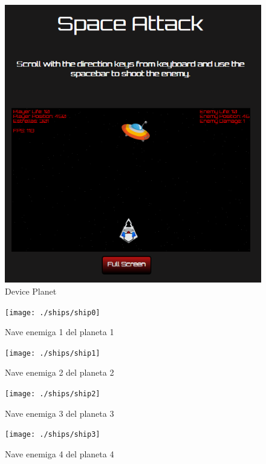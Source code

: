 \documentclass[a4paper,10pt]{article}
\begin{document}
\begin{figure}[htb]
\centering
\includegraphics[width=1\textwidth]{planet}
\caption{Device Planet}
\label{fig:planet}
\end{figure}

\cleardoublepage

\begin{figure}[htbl!]

\begin{minipage}[b]{0.5\linewidth} %
\centering
\texttt{[image: ./ships/ship0]}
\caption{Nave enemiga 1 del planeta 1} \label{figura1}
\end{minipage}
\hspace{0.5cm} %
\begin{minipage}[b]{0.5\linewidth}
\centering
\texttt{[image: ./ships/ship1]}
\caption{Nave enemiga 2 del planeta 2} \label{figura2}
\end{minipage}

\end{figure}


\begin{figure}[htbl!]

\begin{minipage}[b]{0.5\linewidth}
\centering
\texttt{[image: ./ships/ship2]}
\caption{Nave enemiga 3 del planeta 3} \label{figura3}
\end{minipage}
\hspace{0.5cm} %
\begin{minipage}[b]{0.5\linewidth}
\centering
\texttt{[image: ./ships/ship3]}
\caption{Nave enemiga 4 del planeta 4} \label{figura4}
\end{minipage}

\end{figure}
\end{document}
